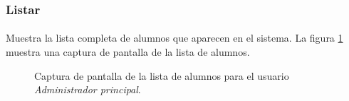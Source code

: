 \subsubsection{Listar}

  \paragraph{}Muestra la lista completa de alumnos que aparecen en el sistema.
  La figura \ref{capturaPantallaListaAlumnosAdminPrincipal} muestra una
  captura de pantalla de la lista de alumnos.

  \begin{figure}[!ht]
    \begin{center}
      \caption{Captura de pantalla de la lista de alumnos para el usuario \textit{Administrador principal}.}
      \label{capturaPantallaListaAlumnosAdminPrincipal}
    \end{center}
  \end{figure}
